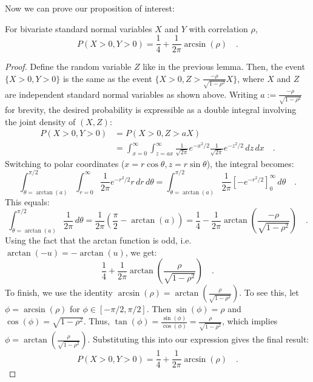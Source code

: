 \documentclass[../../main.tex]{subfiles}
\begin{document}
Now we can prove our proposition of interest:

\begin{proposition}
For bivariate standard normal variables $X$ and $Y$ with correlation $\rho$,
$$ P(X>0, Y>0) = \frac{1}{4} + \frac{1}{2\pi}\arcsin(\rho) \quad . $$
\end{proposition}

\begin{proof}
Define the random variable $Z$ like in the previous lemma. Then, the event $\{X>0, Y>0\}$ is the same as the event $\{X>0, Z > \frac{-\rho}{\sqrt{1-\rho^2}}X\}$, where $X$ and $Z$ are independent standard normal variables as shown above. Writing $a := \frac{-\rho}{\sqrt{1-\rho^2}}$ for brevity, the desired probability is expressible as a double integral involving the joint density of $(X,Z)$:
\begin{align*}
    P(X>0, Y>0) &= P(X>0, Z>aX) \\
    &= \int_{x=0}^{\infty} \int_{z=ax}^{\infty} \frac{1}{\sqrt{2\pi}}e^{-x^2/2} \frac{1}{\sqrt{2\pi}}e^{-z^2/2} \,dz\,dx \quad .
\end{align*}
Switching to polar coordinates ($x=r\cos\theta, z=r\sin\theta$), the integral becomes:
$$ \int_{\theta=\arctan(a)}^{\pi/2} \int_{r=0}^{\infty} \frac{1}{2\pi} e^{-r^2/2} r \,dr\,d\theta = \int_{\theta=\arctan(a)}^{\pi/2} \frac{1}{2\pi} \left[-e^{-r^2/2}\right]_0^\infty \,d\theta \quad . $$
This equals:
$$ \int_{\theta=\arctan(a)}^{\pi/2} \frac{1}{2\pi} \,d\theta = \frac{1}{2\pi}\left(\frac{\pi}{2} - \arctan(a)\right) = \frac{1}{4} - \frac{1}{2\pi}\arctan\left(\frac{-\rho}{\sqrt{1-\rho^2}}\right) \quad  .$$
Using the fact that the arctan function is odd, i.e. $\arctan(-u) = -\arctan(u)$, we get:
$$ \frac{1}{4} + \frac{1}{2\pi}\arctan\left(\frac{\rho}{\sqrt{1-\rho^2}}\right) \quad . $$
To finish, we use the identity $\arcsin(\rho) = \arctan\left(\frac{\rho}{\sqrt{1-\rho^2}}\right)$. To see this, let $\phi = \arcsin(\rho)$ for $\phi \in [-\pi/2, \pi/2]$. Then $\sin(\phi) = \rho$ and $\cos(\phi) = \sqrt{1-\rho^2}$. Thus, $\tan(\phi) = \frac{\sin(\phi)}{\cos(\phi)} = \frac{\rho}{\sqrt{1-\rho^2}}$, which implies $\phi = \arctan\left(\frac{\rho}{\sqrt{1-\rho^2}}\right)$.
Substituting this into our expression gives the final result:
$$ P(X>0, Y>0) = \frac{1}{4} + \frac{1}{2\pi}\arcsin(\rho) \quad . $$
\end{proof}
\end{document}
